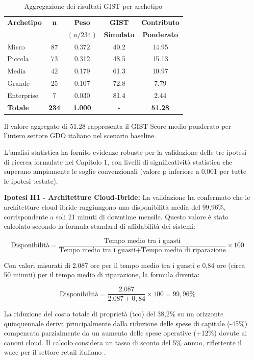 \begin{table}[h!]
\centering
\caption{Aggregazione dei risultati GIST per archetipo}
\small
\begin{tabularx}{\textwidth}{|X|c|c|c|c|}
\hline
\textbf{Archetipo} & \textbf{n} & \textbf{Peso} & \textbf{GIST} & \textbf{Contributo} \\
 & & $(n/234)$ & \textbf{Simulato} & \textbf{Ponderato} \\
\hline
Micro & 87 & 0.372 & 40.2 & 14.95 \\
Piccola & 73 & 0.312 & 48.5 & 15.13 \\
Media & 42 & 0.179 & 61.3 & 10.97 \\
Grande & 25 & 0.107 & 72.8 & 7.79 \\
Enterprise & 7 & 0.030 & 81.4 & 2.44 \\
\hline
\textbf{Totale} & \textbf{234} & \textbf{1.000} & - & \textbf{51.28} \\
\hline
\end{tabularx}
\end{table}

Il valore aggregato di 51.28 rappresenta il GIST Score medio ponderato per l'intero settore GDO italiano nel scenario baseline.

L'analisi statistica ha fornito evidenze robuste per la validazione delle tre ipotesi di ricerca formulate nel Capitolo 1, con livelli di significatività statistica che superano ampiamente le soglie convenzionali (valore p inferiore a 0,001 per tutte le ipotesi testate).

\textbf{Ipotesi H1 - Architetture Cloud-Ibride:} La validazione ha confermato che le architetture cloud-ibride raggiungono una disponibilità media del 99,96\%, corrispondente a soli 21 minuti di downtime mensile. Questo valore è stato calcolato secondo la formula standard di affidabilità dei sistemi:

$$\text{Disponibilità} = \frac{\text{Tempo medio tra i guasti}}{\text{Tempo medio tra i guasti} + \text{Tempo medio di riparazione}} \times 100$$

Con valori misurati di 2.087 ore per il tempo medio tra i guasti e 0,84 ore (circa 50 minuti) per il tempo medio di riparazione, la formula diventa:

$$\text{Disponibilità} = \frac{2.087}{2.087 + 0,84} \times 100 = 99,96\%$$

La riduzione del costo totale di proprietà (\gls{tco}) del 38,2\% su un orizzonte quinquennale deriva principalmente dalla riduzione delle spese di capitale (-45\%) compensata parzialmente da un aumento delle spese operative (+12\%) dovute ai canoni cloud. Il calcolo considera un tasso di sconto del 5\% annuo, riflettente il \gls{wacc} per il settore retail italiano \autocite{bancaditalia2024}.

